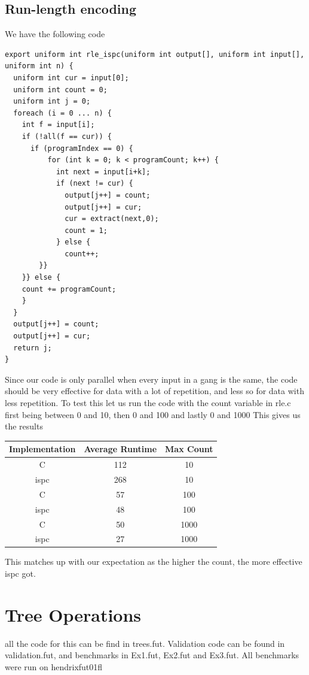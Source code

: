 \documentclass[a4paper,12pt]{article}
\begin{document}
\subsection{Run-length encoding}
We have the following code
\begin{lstlisting}
export uniform int rle_ispc(uniform int output[], uniform int input[], uniform int n) {
  uniform int cur = input[0];
  uniform int count = 0;
  uniform int j = 0;
  foreach (i = 0 ... n) {
    int f = input[i];
    if (!all(f == cur)) {
      if (programIndex == 0) {
          for (int k = 0; k < programCount; k++) {
            int next = input[i+k];
            if (next != cur) {
              output[j++] = count;
              output[j++] = cur;
              cur = extract(next,0);
              count = 1;
            } else {
              count++;
        }}
    }} else {
    count += programCount;
    }
  }
  output[j++] = count;
  output[j++] = cur;
  return j;
}
\end{lstlisting}
Since our code is only parallel when every input in a gang is the same, the
code should be very effective for data with a lot of repetition, and less so
for data with less repetition. To test this let us run the code with the
count variable in rle.c first being between 0 and 10, then 0 and 100 and
lastly 0 and 1000
This gives us the results

\begin{center}
	\begin{tabular}{ |c|c|c| }
		\hline
		Implementation & Average Runtime & Max Count \\
		\hline
		C              & 112             & 10        \\
		ispc           & 268             & 10        \\
		\hline
		C              & 57              & 100       \\
		ispc           & 48              & 100       \\
		\hline
		C              & 50              & 1000      \\
		ispc           & 27              & 1000      \\
		\hline
	\end{tabular}
\end{center}
This matches up with our expectation as the higher the count, the more
effective ispc got.
\section{Tree Operations}
all the code for this can be find in trees.fut. Validation code can be found
in validation.fut, and benchmarks in Ex1.fut, Ex2.fut and Ex3.fut. All
benchmarks were run on hendrixfut01fl
\end{document}

